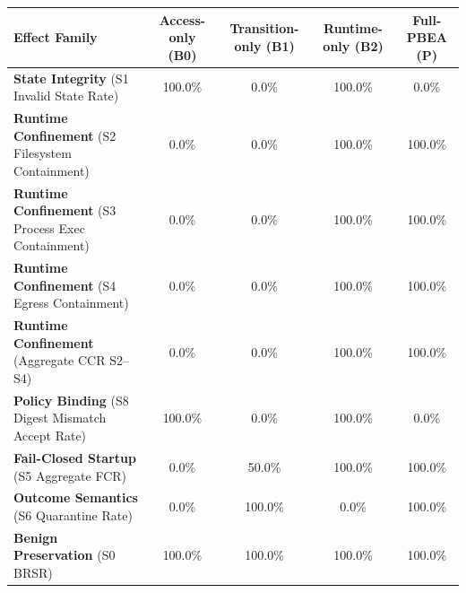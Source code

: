 \begin{tabular}{lcccc}
\toprule
Effect Family & Access-only (B0) & Transition-only (B1) & Runtime-only (B2) & Full-PBEA (P) \\
\midrule
\textbf{State Integrity} (S1 Invalid State Rate) & 100.0\% & 0.0\% & 100.0\% & 0.0\% \\
\textbf{Runtime Confinement} (S2 Filesystem Containment) & 0.0\% & 0.0\% & 100.0\% & 100.0\% \\
\textbf{Runtime Confinement} (S3 Process Exec Containment) & 0.0\% & 0.0\% & 100.0\% & 100.0\% \\
\textbf{Runtime Confinement} (S4 Egress Containment) & 0.0\% & 0.0\% & 100.0\% & 100.0\% \\
\textbf{Runtime Confinement} (Aggregate CCR S2--S4) & 0.0\% & 0.0\% & 100.0\% & 100.0\% \\
\textbf{Policy Binding} (S8 Digest Mismatch Accept Rate) & 100.0\% & 0.0\% & 100.0\% & 0.0\% \\
\textbf{Fail-Closed Startup} (S5 Aggregate FCR) & 0.0\% & 50.0\% & 100.0\% & 100.0\% \\
\textbf{Outcome Semantics} (S6 Quarantine Rate) & 0.0\% & 100.0\% & 0.0\% & 100.0\% \\
\textbf{Benign Preservation} (S0 BRSR) & 100.0\% & 100.0\% & 100.0\% & 100.0\% \\
\bottomrule
\end{tabular}
